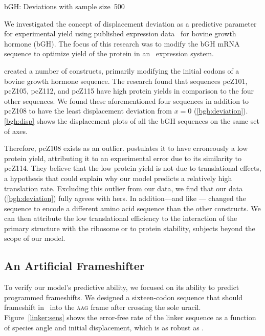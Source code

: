 \documentclass[twocolumn, article, oneside]{memoir}
\begin{document}
\begin{cfigure}
  \caption{bGH: Deviations with sample size~500}
  \label{bgh:deviation}
  \begin{small}
    
  \end{small}
\end{cfigure}

We investigated the concept of displacement deviation as a predictive parameter
for experimental yield using published expression data~\cite{schoner:bgh} for bovine growth hormone (bGH).
The focus of this research was to modify the bGH mRNA sequence to optimize
yield of the protein in an \ecoli\ expression system.

\citet{schoner:bgh} created a number of constructs, primarily
modifying the initial codons of a bovine growth hormone sequence. The
research found that sequences pcZ101, pcZ105, pcZ112, and pcZ115 have
high protein yields in comparison to the four other sequences. We
found these aforementioned four sequences in addition to pcZ108 to
have the least displacement deviation from $x = 0$
(\autoref{bgh:deviation}). \autoref{bgh:disp} shows the displacement
plots of all the bGH sequences on the same set of axes.

Therefore, pcZ108 exists as an outlier. \citeauthor{schoner:bgh}
postulates it to have erroneously a low protein yield, attributing it
to an experimental error due to its similarity to pcZ114. They believe
that the low protein yield is not due to translational effects, a
hypothesis that could explain why our model predicts a relatively high
translation rate. Excluding this outlier from our data, we find that
our data (\autoref{bgh:deviation}) fully agrees with hers. In
addition---and like \citeauthor{weiss87}---\citeauthor{schoner:bgh}
changed the sequence to encode a different amino acid sequence than
the other constructs. We can then attribute the low translational
efficiency to the interaction of the primary structure with the
ribosome or to protein stability, subjects beyond the scope of our
model.

\subsection{An Artificial Frameshifter}
\label{section:linker}
To verify our model's predictive ability, we focused on its ability to
predict programmed frameshifts. We designed a sixteen-codon sequence
that should frameshift in \ecoli\ into
the \textsc{aag} frame after crossing the sole uracil.  Figure~\ref{linker:sens}
shows the error-free rate of the linker sequence as a function of species
angle and initial displacement, which is as robust as \prfB.
\end{document}

